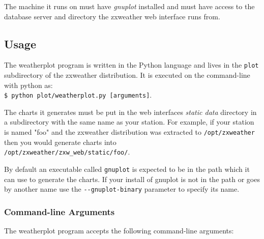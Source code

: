 \documentclass[a4paper,10pt,draft]{book}
\begin{document}
The machine it runs on must have \emph{gnuplot} installed and must have access to the database server and directory the zxweather web interface runs from.

\subsection{Usage}

The weatherplot program is written in the Python language and lives in the \verb|plot| subdirectory of the zxweather distribution. It is executed on the command-line with python as: \\ \verb|$ python plot/weatherplot.py [arguments]|.

The charts it generates must be put in the web interfaces \emph{static data} directory in a subdirectory with the same name as your station. For example, if your station is named "foo" and the zxweather distribution was extracted to \verb|/opt/zxweather| then you would generate charts into \\ \verb|/opt/zxweather/zxw_web/static/foo/|.

By default an executable called \verb|gnuplot| is expected to be in the path which it can use to generate the charts. If your install of gnuplot is not in the path or goes by another name use the \verb|--gnuplot-binary| parameter to specify its name.

\subsubsection{Command-line Arguments}
The weatherplot program accepts the following command-line arguments:
\end{document}
